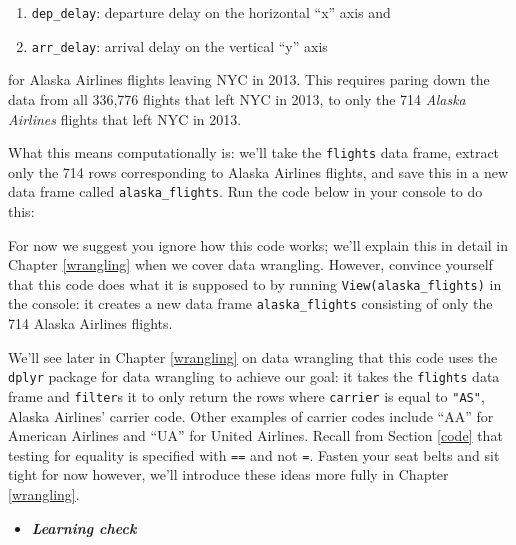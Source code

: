 \documentclass[12pt,]{krantz}
\makeatletter
\newenvironment{Shaded}{\begin{snugshade}}{\end{snugshade}}
\newcommand{\KeywordTok}[1]{\textcolor[rgb]{0.27,0.27,0.27}{\textbf{#1}}}
\newcommand{\StringTok}[1]{\textcolor[rgb]{0.5,0.5,0.5}{#1}}
\newcommand{\OperatorTok}[1]{\textcolor[rgb]{0.43,0.43,0.43}{\textbf{#1}}}
\newcommand{\NormalTok}[1]{#1}
\providecommand{\tightlist}{%
  \setlength{\itemsep}{0pt}\setlength{\parskip}{0pt}}
\newenvironment{kframe}{%
\medskip{}
\setlength{\fboxsep}{.8em}
 \def\at@end@of@kframe{}%
 \ifinner\ifhmode%
  \def\at@end@of@kframe{\end{minipage}}%
  \begin{minipage}{\columnwidth}%
 \fi\fi%
 \def\FrameCommand##1{\hskip\@totalleftmargin \hskip-\fboxsep
 \colorbox{shadecolor}{##1}\hskip-\fboxsep
     \hskip-\linewidth \hskip-\@totalleftmargin \hskip\columnwidth}%
 \MakeFramed {\advance\hsize-\width
   \@totalleftmargin\z@ \linewidth\hsize
   \@setminipage}}%
 {\par\unskip\endMakeFramed%
 \at@end@of@kframe}
\renewenvironment{Shaded}{\begin{kframe}}{\end{kframe}}
\newenvironment{rmdblock}[1]
  {\begin{shaded*}
  \begin{itemize}
  \renewcommand{\labelitemi}{
    \raisebox{-.7\height}[0pt][0pt]{
    }
  }
  \item
  }
  {
  \end{itemize}
  \end{shaded*}
  }
\newenvironment{learncheck}
  {\begin{rmdblock}{warning}}
  {\end{rmdblock}}
\makeatother
\begin{document}
\begin{enumerate}
\def\labelenumi{\arabic{enumi}.}
\tightlist
\item
  \texttt{dep\_delay}: departure delay on the horizontal ``x'' axis and
\item
  \texttt{arr\_delay}: arrival delay on the vertical ``y'' axis
\end{enumerate}

for Alaska Airlines flights leaving NYC in 2013. This requires paring
down the data from all 336,776 flights that left NYC in 2013, to only
the 714 \emph{Alaska Airlines} flights that left NYC in 2013.

What this means computationally is: we'll take the \texttt{flights} data
frame, extract only the 714 rows corresponding to Alaska Airlines
flights, and save this in a new data frame called
\texttt{alaska\_flights}. Run the code below in your console to do this:

\begin{Shaded}
\end{Shaded}

For now we suggest you ignore how this code works; we'll explain this in
detail in Chapter \ref{wrangling} when we cover data wrangling. However,
convince yourself that this code does what it is supposed to by running
\texttt{View(alaska\_flights)} in the console: it creates a new data
frame \texttt{alaska\_flights} consisting of only the 714 Alaska
Airlines flights.

We'll see later in Chapter \ref{wrangling} on data wrangling that this
code uses the \texttt{dplyr} package for data wrangling to achieve our
goal: it takes the \texttt{flights} data frame and \texttt{filter}s it
to only return the rows where \texttt{carrier} is equal to
\texttt{"AS"}, Alaska Airlines' carrier code. Other examples of carrier
codes include ``AA'' for American Airlines and ``UA'' for United
Airlines. Recall from Section \ref{code} that testing for equality is
specified with \texttt{==} and not \texttt{=}. Fasten your seat belts
and sit tight for now however, we'll introduce these ideas more fully in
Chapter \ref{wrangling}.

\begin{learncheck}
\textbf{\emph{Learning check}}
\end{learncheck}
\end{document}

